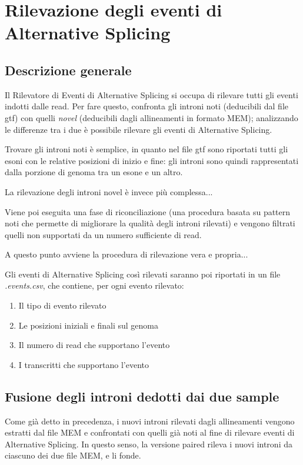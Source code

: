 \section{Rilevazione degli eventi di Alternative Splicing}

\subsection{Descrizione generale}

Il Rilevatore di Eventi di Alternative Splicing si occupa di rilevare tutti gli eventi indotti dalle read. Per fare questo, confronta gli introni noti (deducibili dal file gtf) con quelli \textit{novel} (deducibili dagli allineamenti in formato MEM); analizzando le differenze tra i due è possibile rilevare gli eventi di Alternative Splicing.

Trovare gli introni noti è semplice, in quanto nel file gtf sono riportati tutti gli esoni con le relative posizioni di inizio e fine: gli introni sono quindi rappresentati dalla porzione di genoma tra un esone e un altro. 

La rilevazione degli introni novel è invece più complessa... %

Viene poi eseguita una fase di riconciliazione (una procedura basata su pattern noti che permette di migliorare la qualità degli introni rilevati) e vengono filtrati quelli non supportati da un numero sufficiente di read.

A questo punto avviene la procedura di rilevazione vera e propria... %

Gli eventi di Alternative Splicing così rilevati saranno poi riportati in un file \textit{.events.csv}, che contiene, per ogni evento rilevato:
\begin{enumerate}
	\item Il tipo di evento rilevato
	\item Le posizioni iniziali e finali sul genoma
	\item Il numero di read che supportano l'evento
	\item I transcritti che supportano l'evento
\end{enumerate}

\subsection{Fusione degli introni dedotti dai due sample}

Come già detto in precedenza, i nuovi introni rilevati dagli allineamenti vengono estratti dal file MEM e confrontati con quelli già noti al fine di rilevare eventi di Alternative Splicing. In questo senso, la versione paired rileva i nuovi introni da ciascuno dei due file MEM, e li fonde.

